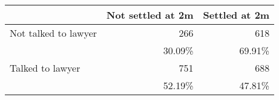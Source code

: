 \begin{tabular}{rrr}
\toprule
      & \multicolumn{1}{l}{Not settled at 2m} & \multicolumn{1}{l}{Settled at 2m} \\
\midrule
\midrule
\multicolumn{1}{l}{Not talked to lawyer} & 266   & 618 \\
      & 30.09\% & 69.91\% \\
\midrule
\multicolumn{1}{l}{Talked to lawyer} & 751   & 688 \\
      & 52.19\% & 47.81\% \\
\bottomrule
\bottomrule
\end{tabular}%
